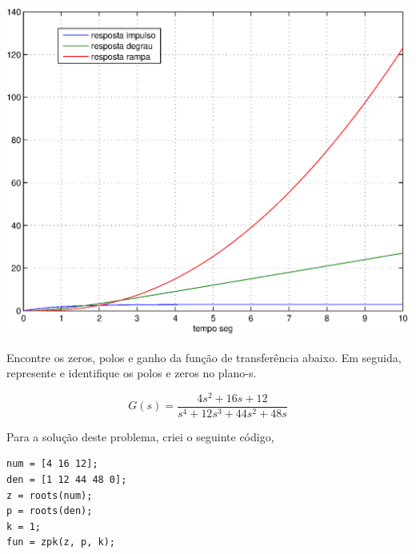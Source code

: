 \documentclass[a4paper, 10pt]{article}
\begin{document}
\begin{list}{\textbf{Questão .}}{
\setlength{\labelwidth}{-2mm} \setlength{\parsep}{0mm}
\setlength{\topsep}{0mm} \setlength{\leftmargin}{0mm}}
\begin{enumerate}
             \begin{center}
                \includegraphics[scale=0.6]{fig2q.eps}
             \end{center}


    \end{enumerate}

\newpage

\item
    Encontre os zeros, polos e ganho da função de transferência abaixo. Em seguida, 
    represente e identifique os polos e zeros no plano-s.

    $$
    G(s) = \frac{4 s^2 + 16 s + 12}{s^4 + 12 s^3 +  44 s^2 + 48 s}
    $$


    Para a solução deste problema, criei o seguinte código,

 
     \begin{lstlisting}
num = [4 16 12];
den = [1 12 44 48 0];
z = roots(num);
p = roots(den);
k = 1;
fun = zpk(z, p, k);
     \end{lstlisting}


\end{list}
\end{document}
